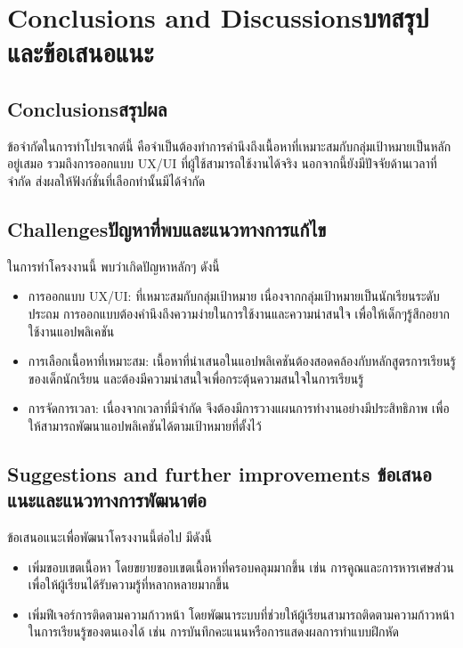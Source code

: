 \chapter{\ifenglish Conclusions and Discussions\else บทสรุปและข้อเสนอแนะ\fi}

\section{\ifenglish Conclusions\else สรุปผล\fi}

ข้อจำกัดในการทำโปรเจกต์นี้ คือจำเป็นต้องทำการคำนึงถึงเนื้อหาที่เหมาะสมกับกลุ่มเป้าหมายเป็นหลักอยู่เสมอ รวมถึงการออกแบบ UX/UI ที่ผู้ใช้สามารถใช้งานได้จริง นอกจากนี้ยังมีปัจจัยด้านเวลาที่จำกัด ส่งผลให้ฟังก์ชั่นที่เลือกทำนั้นมีได้จำกัด

\section{\ifenglish Challenges\else ปัญหาที่พบและแนวทางการแก้ไข\fi}

ในการทำโครงงานนี้ พบว่าเกิดปัญหาหลักๆ ดังนี้
\begin{itemize}
    \item การออกแบบ UX/UI: ที่เหมาะสมกับกลุ่มเป้าหมาย เนื่องจากกลุ่มเป้าหมายเป็นนักเรียนระดับประถม การออกแบบต้องคำนึงถึงความง่ายในการใช้งานและความน่าสนใจ เพื่อให้เด็กๆรู้สึกอยากใช้งานแอปพลิเคชัน
    \item การเลือกเนื้อหาที่เหมาะสม: เนื้อหาที่นำเสนอในแอปพลิเคชันต้องสอดคล้องกับหลักสูตรการเรียนรู้ของเด็กนักเรียน และต้องมีความน่าสนใจเพื่อกระตุ้นความสนใจในการเรียนรู้
    \item การจัดการเวลา: เนื่องจากเวลาที่มีจำกัด จึงต้องมีการวางแผนการทำงานอย่างมีประสิทธิภาพ เพื่อให้สามารถพัฒนาแอปพลิเคชันได้ตามเป้าหมายที่ตั้งไว้
\end{itemize}

\section{\ifenglish%
Suggestions and further improvements
\else%
ข้อเสนอแนะและแนวทางการพัฒนาต่อ
\fi
}

ข้อเสนอแนะเพื่อพัฒนาโครงงานนี้ต่อไป มีดังนี้
\begin{itemize}
    \item เพิ่มขอบเขตเนื้อหา โดยขยายขอบเขตเนื้อหาที่ครอบคลุมมากขึ้น เช่น การคูณและการหารเศษส่วน เพื่อให้ผู้เรียนได้รับความรู้ที่หลากหลายมากขึ้น
    \item เพิ่มฟีเจอร์การติดตามความก้าวหน้า โดยพัฒนาระบบที่ช่วยให้ผู้เรียนสามารถติดตามความก้าวหน้าในการเรียนรู้ของตนเองได้ เช่น การบันทึกคะแนนหรือการแสดงผลการทำแบบฝึกหัด 
\end{itemize}